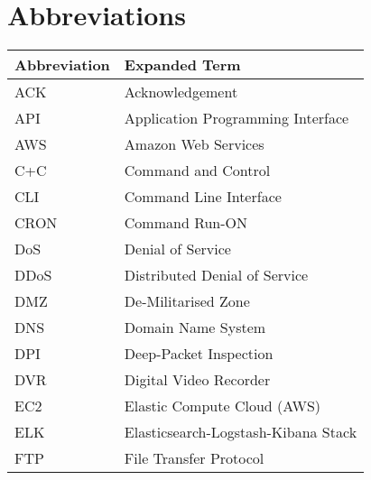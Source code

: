 \chapter{Abbreviations} \label{Abbrevations}

\begin{tabular}{p{40mm}|p{100mm}}
	\textbf{Abbreviation}&\textbf{Expanded Term}\\
	\hline
	ACK&Acknowledgement\\
    API&Application Programming Interface\\
    AWS&Amazon Web Services\\
    C+C&Command and Control\\
    CLI&Command Line Interface\\
    CRON&Command Run-ON\\
    DoS&Denial of Service\\
    DDoS&Distributed Denial of Service \\
    DMZ&De-Militarised Zone\\
    DNS&Domain Name System\\
    DPI&Deep-Packet Inspection\\
    DVR&Digital Video Recorder\\
    EC2&Elastic Compute Cloud (AWS)\\
	ELK&Elasticsearch-Logstash-Kibana Stack\\
    FTP&File Transfer Protocol\\

\end{tabular}    

